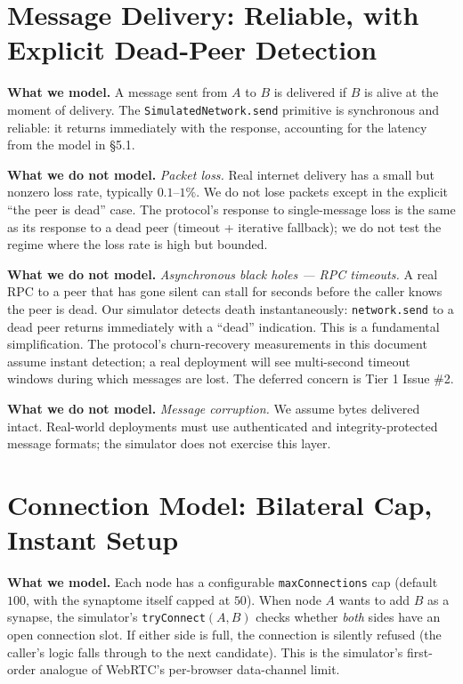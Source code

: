 \documentclass[twoside,nobib]{tufte-book}
\begin{document}
\section{Message Delivery: Reliable, with Explicit Dead-Peer Detection}

\textbf{What we model.} A message sent from $A$ to $B$ is
delivered if $B$ is alive at the moment of delivery. The
\texttt{SimulatedNetwork.send} primitive is synchronous and
reliable: it returns immediately with the response, accounting
for the latency from the model in \S5.1.

\textbf{What we do not model.} \emph{Packet loss.} Real internet
delivery has a small but nonzero loss rate, typically
$0.1$--$1\%$. We do not lose packets except in the explicit
``the peer is dead'' case. The protocol's response to single-message
loss is the same as its response to a dead peer (timeout +
iterative fallback); we do not test the regime where the loss
rate is high but bounded.

\textbf{What we do not model.} \emph{Asynchronous black holes ---
RPC timeouts.} A real RPC to a peer that has gone silent can
stall for seconds before the caller knows the peer is dead. Our
simulator detects death instantaneously: \texttt{network.send}
to a dead peer returns immediately with a ``dead'' indication.
This is a fundamental simplification. The protocol's churn-recovery
measurements in this document assume instant detection; a real
deployment will see multi-second timeout windows during which
messages are lost. The deferred concern is Tier 1 Issue \#2.

\textbf{What we do not model.} \emph{Message corruption.} We
assume bytes delivered intact. Real-world deployments must use
authenticated and integrity-protected message formats; the
simulator does not exercise this layer.

\section{Connection Model: Bilateral Cap, Instant Setup}

\textbf{What we model.} Each node has a configurable
\texttt{maxConnections} cap (default $100$, with the synaptome
itself capped at $50$). When node $A$ wants to add $B$ as a
synapse, the simulator's \texttt{tryConnect}$(A, B)$ checks
whether \emph{both} sides have an open connection slot. If
either side is full, the connection is silently refused (the
caller's logic falls through to the next candidate). This is the
simulator's first-order analogue of WebRTC's per-browser
data-channel limit.
\end{document}
